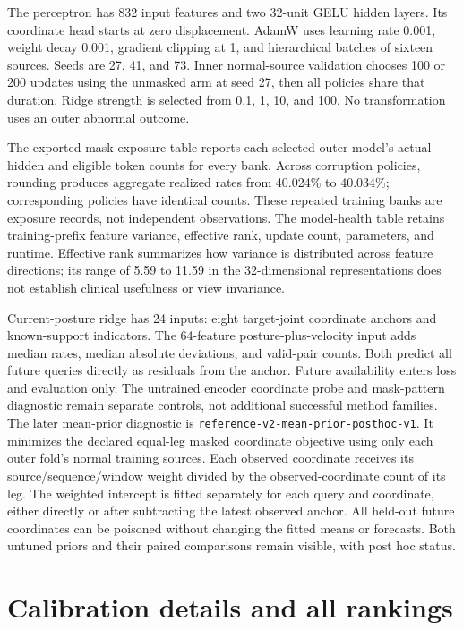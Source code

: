 \documentclass[letterpaper]{article}
\begin{document}
The perceptron has 832 input features and two 32-unit GELU hidden layers. Its coordinate head starts at zero displacement. AdamW uses learning rate 0.001, weight decay 0.001, gradient clipping at 1, and hierarchical batches of sixteen sources. Seeds are 27, 41, and 73. Inner normal-source validation chooses 100 or 200 updates using the unmasked arm at seed 27, then all policies share that duration. Ridge strength is selected from 0.1, 1, 10, and 100. No transformation uses an outer abnormal outcome.

The exported mask-exposure table reports each selected outer model's actual hidden and eligible token counts for every bank. Across corruption policies, rounding produces aggregate realized rates from 40.024\% to 40.034\%; corresponding policies have identical counts. These repeated training banks are exposure records, not independent observations. The model-health table retains training-prefix feature variance, effective rank, update count, parameters, and runtime. Effective rank summarizes how variance is distributed across feature directions; its range of 5.59 to 11.59 in the 32-dimensional representations does not establish clinical usefulness or view invariance.

Current-posture ridge has 24 inputs: eight target-joint coordinate anchors and known-support indicators. The 64-feature posture-plus-velocity input adds median rates, median absolute deviations, and valid-pair counts. Both predict all future queries directly as residuals from the anchor. Future availability enters loss and evaluation only. The untrained encoder coordinate probe and mask-pattern diagnostic remain separate controls, not additional successful method families. The later mean-prior diagnostic is \texttt{reference-v2-mean-prior-posthoc-v1}. It minimizes the declared equal-leg masked coordinate objective using only each outer fold's normal training sources. Each observed coordinate receives its source/sequence/window weight divided by the observed-coordinate count of its leg. The weighted intercept is fitted separately for each query and coordinate, either directly or after subtracting the latest observed anchor. All held-out future coordinates can be poisoned without changing the fitted means or forecasts. Both untuned priors and their paired comparisons remain visible, with post hoc status.

\section{Calibration details and all rankings}
\end{document}
